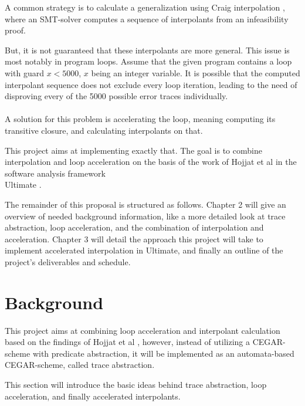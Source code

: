 \documentclass{article}
\begin{document}
A common strategy is \cite{10.1007/978-3-642-03237-0_7} to calculate a generalization using Craig interpolation \cite{craig_1957}, where an SMT-solver computes a sequence of interpolants from an infeasibility proof. \par 
But, it is not guaranteed that these interpolants are more general. This issue is most notably in program loops. Assume that the given program contains a loop with guard $x < 5000$, $x$ being an integer variable. It is possible that the computed interpolant sequence does not exclude every loop iteration, leading to the need of disproving every of the 5000 possible error traces individually. \\ \\
A solution for this problem is accelerating the loop, meaning computing its transitive closure, and calculating interpolants on that. \par This project aims at implementing exactly that. 
The goal is to combine interpolation and loop acceleration on the basis of the work of Hojjat et al \cite{10.1007/978-3-642-33386-6_16} in the software analysis framework \\ Ultimate \cite{Zitat02}. \par
The remainder of this proposal is structured as follows. Chapter 2 will give an overview of needed background information, like a more detailed look at trace abstraction, loop acceleration, and the combination of interpolation and acceleration. Chapter 3 will detail the approach this project will take to implement accelerated interpolation in Ultimate, and finally an outline of the project's deliverables and schedule.

\section{Background}
This project aims at combining loop acceleration and interpolant calculation based on the findings of Hojjat et al \cite{10.1007/978-3-642-33386-6_16}, however, instead of utilizing a CEGAR-scheme with predicate abstraction, it will be implemented as an automata-based CEGAR-scheme, called trace abstraction. \par
This section will introduce the basic ideas behind trace abstraction, loop acceleration, and finally accelerated interpolants.
\end{document}
